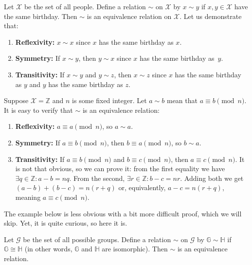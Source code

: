 \documentclass[../lecture-notes-148x210.tex]{subfiles}
\begin{document}
\begin{example}
    Let $\mathcal{X}$ be the set of all people. Define a relation $\sim$ on $\mathcal{X}$ by $x \sim y$ if $x,y \in \mathcal{X}$ have the same birthday. 
    Then $\sim$ is an equivalence relation on $\mathcal{X}$. Let us demonstrate that:
    \begin{enumerate}
        \item \textbf{Reflexivity:} $x \sim x$ since $x$ has the same birthday as $x$.
        \item \textbf{Symmetry:} If $x \sim y$, then $y \sim x$ since $x$ has the same birthday as~$y$.
        \item \textbf{Transitivity:} If $x \sim y$ and $y \sim z$, then $x \sim z$ since $x$ has the same birthday as $y$ and $y$ has the same birthday as $z$.
    \end{enumerate}
\end{example}

\begin{example}
    Suppose $\mathcal{X} = \mathbb{Z}$ and $n$ is some fixed integer. Let $a \sim b$ mean that $a \equiv b \pmod{n}$. It is easy to verify that $\sim$ is an equivalence relation:
    \begin{enumerate}
        \item \textbf{Reflexivity:} $a \equiv a \pmod{n}$, so $a \sim a$.
        \item \textbf{Symmetry:} If $a \equiv b \pmod{n}$, then $b \equiv a \pmod{n}$, so $b \sim a$.
        \item \textbf{Transitivity:} If $a \equiv b \pmod{n}$ and $b \equiv c \pmod{n}$, then $a \equiv c \pmod{n}$. It is not that obvious, so we can prove it: from the first equality we have $\exists q \in \mathbb{Z}: a-b = nq$. From the second, $\exists r \in \mathbb{Z}: b-c = nr$. Adding both we get $(a-b)+(b-c) = n(r+q)$ or, equivalently, $a-c = n(r+q)$, meaning $a \equiv c \pmod{n}$.
    \end{enumerate}
\end{example}

The example below is less obvious with a bit more difficult proof, which we will skip. Yet, it is quite curious, so here it is.

\begin{example}
    Let $\mathcal{G}$ be the set of all possible groups. Define a relation $\sim$ on $\mathcal{G}$ by $\mathbb{G} \sim \mathbb{H}$ if $\mathbb{G} \cong \mathbb{H}$ (in other words, $\mathbb{G}$ and $\mathbb{H}$ are isomorphic). Then $\sim$ is an equivalence relation.
\end{example}
\end{document}
